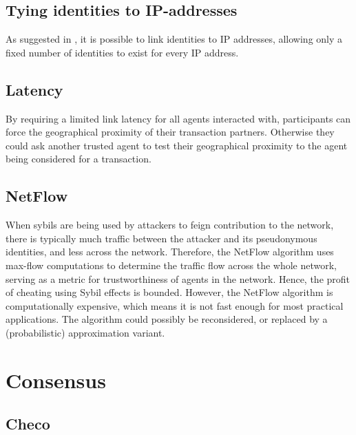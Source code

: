 \subsection{Tying identities to IP-addresses}
As suggested in \cite{meulpolder2009bartercast}, it is possible to link identities to IP addresses, allowing only a fixed number of identities to exist for every IP address.

\subsection{Latency}
By requiring a limited link latency for all agents interacted with, participants can force the geographical proximity of their transaction partners. Otherwise they could ask another trusted agent to test their geographical proximity to the agent being considered for a transaction.

\subsection{NetFlow}
When sybils are being used by attackers to feign contribution to the network, 
there is typically much traffic between the attacker and its pseudonymous identities, 
and less across the network. 
Therefore, the NetFlow algorithm uses max-flow computations to determine the traffic flow across the whole network, 
serving as a metric for trustworthiness of agents in the network. Hence, the profit of cheating using Sybil effects is bounded. 
However, the NetFlow algorithm is computationally expensive, 
which means it is not fast enough for most practical applications. 
The algorithm could possibly be reconsidered, 
or replaced by a (probabilistic) approximation variant. 

\section{Consensus}
\subsection{Checo}
